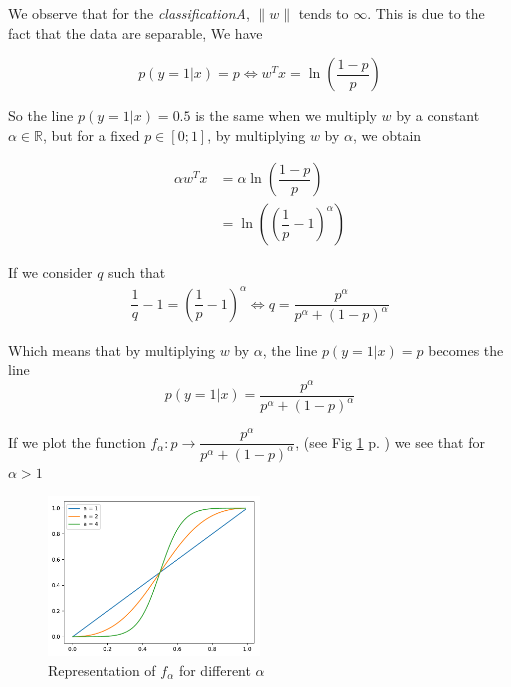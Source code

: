 \documentclass[a4paper, 11pt]{article}
\newcommand{\file}[1]{\emph{#1}}
\newcommand{\Fig}[1]{Fig \ref{#1} p. \pageref{#1}}
\newcommand{\intr}[2]{\left[ #1 ; #2 \right]}
\newcommand{\norm}[1]{\|#1\|}
\begin{document}
We observe that for the \file{classificationA}, $\norm{w}$ tends
to $\infty$. This is due to the fact that the data are separable,
We have

\begin{equation*}
  p(y = 1 | x) = p \Leftrightarrow w^T x = \ln{\left( \dfrac{1 - p}{p} \right)}
\end{equation*}

So the line $p(y = 1 | x) = 0.5$ is the same when we multiply $w$
by a constant $\alpha \in \mathbb{R}$, but for a fixed
$p \in \intr{0}{1}$, by multiplying $w$ by $\alpha$, we obtain

\begin{align*}
  \alpha  w^T x & = \alpha \ln{\left( \dfrac{1 - p}{p} \right)} \\
  & = \ln{\left(\left( \dfrac{1}{p} - 1\right)^\alpha\right)}
\end{align*}

If we consider $q$ such that
\begin{align*}
  \dfrac{1}{q} - 1 = \left( \dfrac{1}{p} - 1\right)^\alpha \Leftrightarrow q = \dfrac{p^\alpha}{p^\alpha + (1 - p)^\alpha}
\end{align*}

Which means that by multiplying $w$ by $\alpha$, the line
$p(y = 1 | x) = p$ becomes the line
\begin{equation*}
  p(y = 1 | x) = \dfrac{p^\alpha}{p^\alpha + (1 - p)^\alpha}
\end{equation*}

If we plot the function $f_\alpha : p \rightarrow \dfrac{p^\alpha}{p^\alpha + (1 - p)^\alpha}$,
(see \Fig{fig:scaleW}) we see that for $\alpha > 1$


\begin{figure}[h]
\centering
\includegraphics[width=0.5\textwidth]{scaleW.pdf}
\caption{Representation of $f_\alpha$ for different $\alpha$}
\label{fig:scaleW}
\end{figure}
\end{document}
